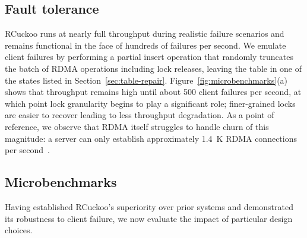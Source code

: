 
\subsection{Fault tolerance}


RCuckoo runs at nearly full throughput during realistic
failure scenarios and remains functional in the face of
hundreds of failures per second.
We emulate client failures by
performing a partial insert operation that randomly truncates the
batch of RDMA operations including lock releases, leaving the table
in one of the  states listed in
Section~\ref{sec:table-repair}.
Figure~\ref{fig:microbenchmarks}(a) shows that
throughput remains high until about 500 client failures per second, at
which point lock granularity begins to play a significant role;
finer-grained locks are easier to recover leading to less throughput
degradation.
As a point of reference, we observe that RDMA itself struggles to handle churn of this magnitude:
a server can only
establish approximately 1.4~K RDMA connections per second~\cite{xrdma}.

\subsection{Microbenchmarks}


Having established RCuckoo's superiority over prior systems and
demonstrated its robustness to client failure, we now evaluate the
impact of particular design choices.





